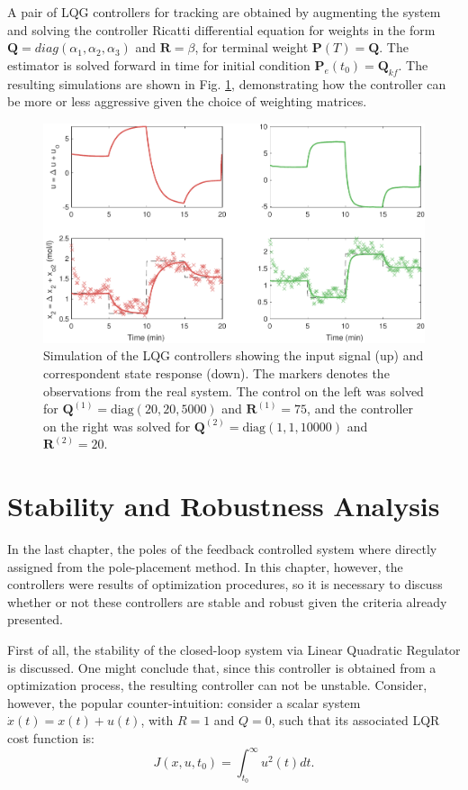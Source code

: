\documentclass[a4paper,11pt]{book}
\numberwithin{figure}{chapter}
\numberwithin{equation}{chapter}
\numberwithin{table}{chapter}
\theoremstyle{definition}
\begin{document}
\noindent A pair of LQG controllers for tracking are obtained by augmenting the system and solving the controller Ricatti differential equation for weights in the form $\bm{Q} = diag(\alpha_1, \alpha_2, \alpha_3)$ and $\bm{R} = \beta$, for terminal weight $\bm{P}(T) = \bm{Q}$. The estimator is solved forward in time for initial condition $\bm{P}_e(t_0) = \bm{Q}_{kf}$. The resulting simulations are shown in Fig. \ref{fig:lqg02}, demonstrating how the controller can be more or less aggressive given the choice of weighting matrices.

\begin{figure}[ht]
	\centering
	\includegraphics[width=\textwidth]{chapter4/report_ch4_1}
	\caption{Simulation of the LQG controllers showing the input signal (up) and correspondent state response (down). The markers denotes the observations from the real system. The control on the left was solved for $\bm{Q}^{(1)} = \text{diag}(20, 20, 5000)$ and $\bm{R}^{(1)} = 75$, and the controller on the right was solved for $\bm{Q}^{(2)} = \text{diag}(1, 1, 10000)$ and $\bm{R}^{(2)} = 20$.}
	\label{fig:lqg02}
\end{figure}

\section{Stability and Robustness Analysis}

In the last chapter, the poles of the feedback controlled system where directly assigned from the pole-placement method. In this chapter, however, the controllers were results of optimization procedures, so it is necessary to discuss whether or not these controllers are stable and robust given the criteria already presented. 

First of all, the stability of the closed-loop system via Linear Quadratic Regulator is discussed. One might conclude that, since this controller is obtained from a optimization process, the resulting controller can not be unstable. Consider, however, the popular counter-intuition: consider a scalar system $\dot{x}(t) = x(t) + u(t)$, with $R = 1$ and $Q = 0$, such that its associated LQR cost function is:
\begin{equation}
    J(x,u,t_0) = \int_{t_0}^{\infty} u^2(t) dt
.\end{equation}
\end{document}
